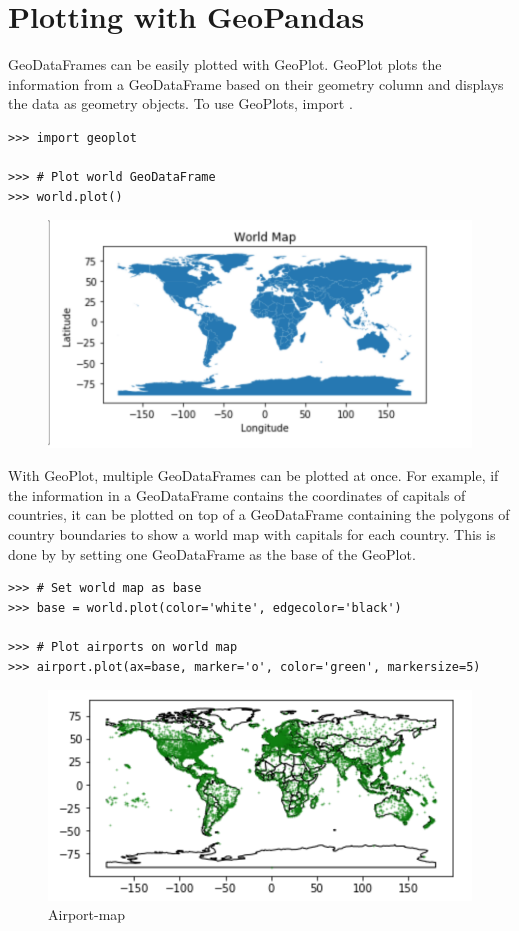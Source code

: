 \section*{Plotting with GeoPandas}

GeoDataFrames can be easily plotted with GeoPlot.
GeoPlot plots the information from a GeoDataFrame based on their geometry column and displays the data as geometry objects.
To use GeoPlots, import .

\begin{lstlisting}
>>> import geoplot

>>> # Plot world GeoDataFrame
>>> world.plot()
\end{lstlisting}

\begin{figure}[H]
\begin{center}
\includegraphics[width=0.7\columnwidth]{figures/worldmap.pdf}
\end{center}
\label{world-map}
\end{figure} 

With GeoPlot, multiple GeoDataFrames can be plotted at once.
For example, if the information in a GeoDataFrame contains the coordinates of capitals of countries, it can be plotted on top of a GeoDataFrame containing the polygons of country boundaries to show a world map with capitals for each country.
This is done by by setting one GeoDataFrame as the base of the GeoPlot.

\begin{lstlisting}
>>> # Set world map as base
>>> base = world.plot(color='white', edgecolor='black')

>>> # Plot airports on world map
>>> airport.plot(ax=base, marker='o', color='green', markersize=5)
\end{lstlisting}

\begin{figure}[H]
\begin{center}
\includegraphics[width=0.7\columnwidth]{figures/airports.pdf}
\end{center}
\label{airport-map}
\caption{Airport-map}
\end{figure}

